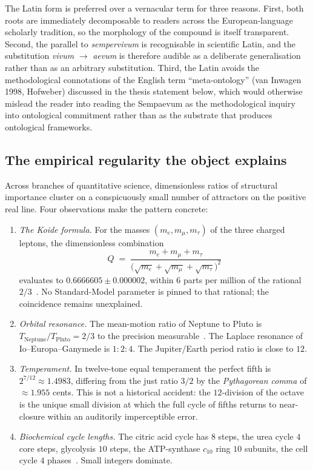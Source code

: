 \documentclass[11pt,a4paper]{article}
\theoremstyle{definition}
\theoremstyle{remark}
\begin{document}
The Latin form is preferred over a vernacular term for three reasons. First, both roots are immediately decomposable to readers across the European-language scholarly tradition, so the morphology of the compound is itself transparent. Second, the parallel to \emph{sempervivum} is recognisable in scientific Latin, and the substitution \emph{vivum} $\to$ \emph{aevum} is therefore audible as a deliberate generalisation rather than as an arbitrary substitution. Third, the Latin avoids the methodological connotations of the English term ``meta-ontology'' (van Inwagen 1998, Hofweber) discussed in the thesis statement below, which would otherwise mislead the reader into reading the Sempaevum as the methodological inquiry into ontological commitment rather than as the substrate that produces ontological frameworks.

\subsection{The empirical regularity the object explains}

Across branches of quantitative science, dimensionless ratios of structural importance cluster on a conspicuously small number of attractors on the positive real line. Four observations make the pattern concrete:

\begin{enumerate}[leftmargin=*]
\item \emph{The Koide formula.} For the masses $(m_e,m_{\mu},m_{\tau})$ of the three charged leptons, the dimensionless combination
\[
Q \;=\; \frac{m_e+m_{\mu}+m_{\tau}}{\bigl(\sqrt{m_e}+\sqrt{m_{\mu}}+\sqrt{m_{\tau}}\bigr)^{2}}
\]
evaluates to $0.6666605\pm 0.000002$, within $6$ parts per million of the rational $2/3$~\cite{Koide1982}. No Standard-Model parameter is pinned to that rational; the coincidence remains unexplained.
\item \emph{Orbital resonance.} The mean-motion ratio of Neptune to Pluto is $T_{\mathrm{Neptune}}/T_{\mathrm{Pluto}}=2/3$ to the precision measurable~\cite{CohenHubbard1965}. The Laplace resonance of Io--Europa--Ganymede is $1{:}2{:}4$. The Jupiter/Earth period ratio is close to $12$.
\item \emph{Temperament.} In twelve-tone equal temperament the perfect fifth is $2^{7/12}\approx 1.4983$, differing from the just ratio $3/2$ by the \emph{Pythagorean comma} of $\approx 1.955$ cents. This is not a historical accident: the $12$-division of the octave is the unique small division at which the full cycle of fifths returns to near-closure within an auditorily imperceptible error.
\item \emph{Biochemical cycle lengths.} The citric acid cycle has $8$ steps, the urea cycle $4$ core steps, glycolysis $10$ steps, the ATP-synthase $c_{10}$ ring $10$ subunits, the cell cycle $4$ phases~\cite{Alberts}. Small integers dominate.
\end{enumerate}
\end{document}

